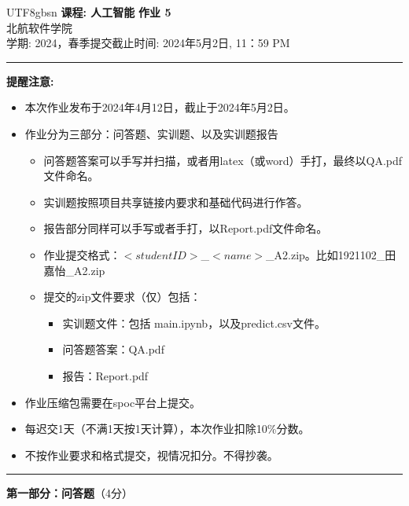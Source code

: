 \documentclass[a4paper, 11pt]{article}
\newenvironment{problem}[2][Q]
    { \begin{mdframed}[backgroundcolor=gray!20] \textbf{#1 #2} \\}
    {  \end{mdframed}}
\begin{document}
\begin{CJK}{UTF8}{gbsn}
\noindent
\large\textbf{课程: 人工智能} \hfill \textbf{作业 5}   \\
北航软件学院 \\
\normalsize 学期: 2024，春季\hfill 提交截止时间:  2024年5月2日, 11：59 PM \\
\noindent\rule{7in}{2.8pt}
\textbf{提醒注意:}
\begin{itemize}
\item 本次作业发布于2024年4月12日，截止于2024年5月2日。
\item 作业分为三部分：问答题、实训题、以及实训题报告
\begin{itemize}
    \item 问答题答案可以手写并扫描，或者用latex（或word）手打，最终以QA.pdf文件命名。
    \item 实训题按照项目共享链接内要求和基础代码进行作答。
    \item 报告部分同样可以手写或者手打，以Report.pdf文件命名。
    \item 作业提交格式：$<student ID>$\_$<name>$\_A2.zip。比如1921102\_田嘉怡\_A2.zip
    \item 提交的zip文件要求（仅）包括：
    \begin{itemize}
        \item 实训题文件：包括 main.ipynb，以及predict.csv文件。
        \item 问答题答案：QA.pdf
        \item 报告：Report.pdf
    \end{itemize}
    
\end{itemize}
\item 作业压缩包需要在spoc平台上提交。
\item 每迟交1天（不满1天按1天计算），本次作业扣除10\%分数。
\item 不按作业要求和格式提交，视情况扣分。不得抄袭。
\end{itemize}

\noindent\rule{7in}{1pt}
\textbf{第一部分：问答题}（4分）


\end{CJK}
\end{document}
